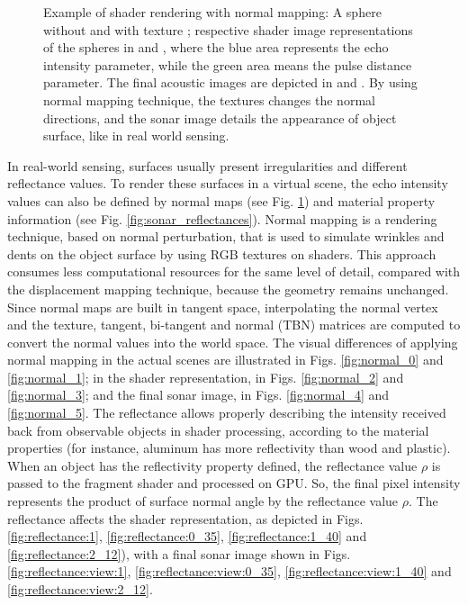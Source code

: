 \documentclass[final,5p,times]{elsarticle}
\begin{document}
\begin{figure}[!ht]
{        \label{fig:normal_5}
    }
    \captionsetup{justification=justified}
    \caption{Example of shader rendering with normal mapping:
    A sphere without  and with texture  ; respective shader image representations of the spheres  in  and , where the blue area represents the echo intensity parameter, while the green area means the pulse distance parameter. The final acoustic images are depicted in  and . By using normal mapping technique, the textures changes the normal directions, and the sonar image details the appearance of object surface, like in real world sensing.}
    \label{fig:sonar_normal_mapping}
\end{figure}

In real-world sensing, surfaces usually present irregularities
and different reflectance values. To render these surfaces in a virtual scene, the echo intensity values can also be defined by normal maps (see Fig. \ref{fig:sonar_normal_mapping}) and material property information (see Fig. \ref{fig:sonar_reflectances}). Normal mapping is a rendering technique, based on normal perturbation, that is used to simulate wrinkles and dents on the object surface by using RGB textures on shaders. This approach consumes less computational
resources for the same level of detail, compared with the displacement mapping
technique, because the geometry remains unchanged. Since normal maps are built in tangent space, interpolating the normal vertex and the texture, tangent, bi-tangent and normal (TBN) matrices are computed to convert the normal values into the world space. The visual differences of applying normal mapping in the actual scenes are illustrated in Figs. \ref{fig:normal_0} and \ref{fig:normal_1}; in the shader representation, in Figs. \ref{fig:normal_2} and \ref{fig:normal_3}; and the final sonar image, in Figs. \ref{fig:normal_4} and \ref{fig:normal_5}. The reflectance allows properly describing the intensity received back from observable objects in shader processing, according to the material
properties (for instance, aluminum has more reflectivity than wood and plastic).
When an object has the reflectivity property defined, the reflectance value
$\rho$ is passed to the fragment shader and processed on GPU. So, the final pixel intensity represents the product of surface normal angle by the reflectance value $\rho$. The reflectance affects the shader representation, as depicted in Figs. \ref{fig:reflectance:1}, \ref{fig:reflectance:0_35}, \ref{fig:reflectance:1_40} and \ref{fig:reflectance:2_12}), with a final sonar image shown in Figs. \ref{fig:reflectance:view:1}, \ref{fig:reflectance:view:0_35}, \ref{fig:reflectance:view:1_40} and \ref{fig:reflectance:view:2_12}.
\end{document}
